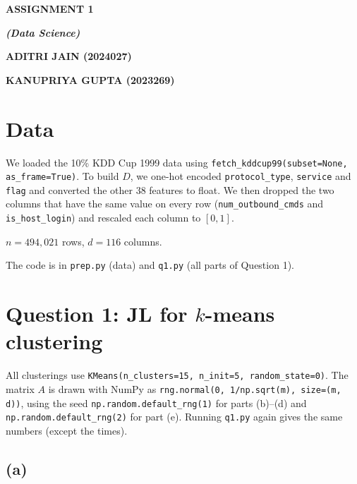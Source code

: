 \documentclass[11pt,a4paper]{article}
\begin{document}
\begin{titlepage}
    \centering
    \vspace*{6cm}
    {\LARGE\bfseries ASSIGNMENT 1\par}
    \vspace{0.8cm}
    {\large\bfseries\itshape (Data Science)\par}
    \vfill
    {\large\bfseries ADITRI JAIN (2024027)\par}
    \vspace{0.4cm}
    {\large\bfseries KANUPRIYA GUPTA (2023269)\par}
    \vspace{2cm}
\end{titlepage}

\section*{Data}

We loaded the 10\% KDD Cup 1999 data using \texttt{fetch\_kddcup99(subset=None, as\_frame=True)}.
To build $D$, we one-hot encoded \texttt{protocol\_type}, \texttt{service} and \texttt{flag}
and converted the other 38 features to float. We then dropped the two columns that have the
same value on every row (\texttt{num\_outbound\_cmds} and \texttt{is\_host\_login}) and
rescaled each column to $[0,1]$.

\begin{center}
$n = 494{,}021$ rows, \qquad $d = 116$ columns.
\end{center}

The code is in \texttt{prep.py} (data) and \texttt{q1.py} (all parts of Question 1).

\section*{Question 1: JL for $k$-means clustering}

All clusterings use \texttt{KMeans(n\_clusters=15, n\_init=5, random\_state=0)}. The matrix $A$
is drawn with NumPy as \texttt{rng.normal(0, 1/np.sqrt(m), size=(m, d))}, using the seed
\texttt{np.random.default\_rng(1)} for parts (b)--(d) and \texttt{np.random.default\_rng(2)}
for part (e). Running \texttt{q1.py} again gives the same numbers (except the times).

\subsection*{(a)}
\end{document}
